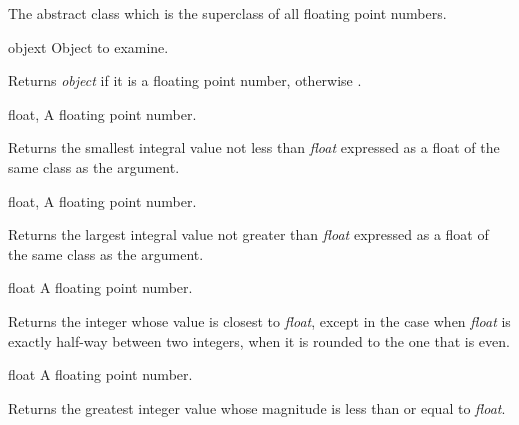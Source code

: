 \begin{optDefinition}
%
The abstract class which is the superclass of all floating point
numbers.
%
\begin{arguments}
    \item[objext] Object to examine.
\end{arguments}
%
\result%
Returns {\em object\/} if it is a floating point number, otherwise \nil{}.

%
\begin{genericargs}
    \item[float, \classref{float}] A floating point number.
\end{genericargs}
%
\result%
Returns the smallest integral value not less than {\em float\/} expressed as a
float of the same class as the argument.

%
\begin{genericargs}
    \item[float, \classref{float}] A floating point number.
\end{genericargs}
%
\result%
Returns the largest integral value not greater than {\em float\/} expressed as a
float of the same class as the argument.

%
\begin{arguments}
    \item[float] A floating point number.
\end{arguments}
%
\result%
Returns the integer whose value is closest to {\em float}, except in the case
when {\em float\/} is exactly half-way between two integers, when it is rounded
to the one that is even.

%
\begin{arguments}
    \item[float] A floating point number.
\end{arguments}
%
\result%
Returns the greatest integer value whose magnitude is less than or equal to {\em
    float}.
%
\end{optDefinition}
